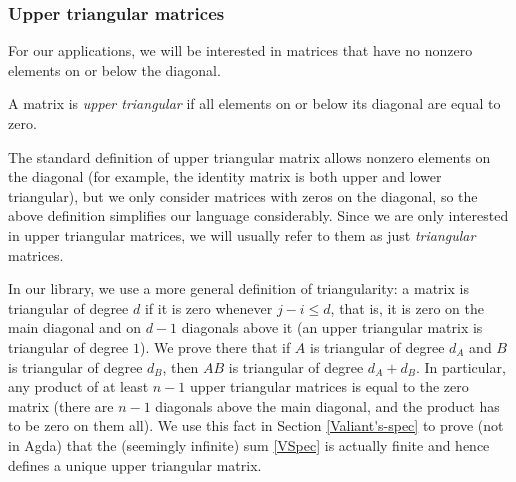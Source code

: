 \subsubsection{Upper triangular matrices}
\label{Triangular-matrices}
For our applications, we will be interested in matrices that have no nonzero elements on or below the diagonal.
\begin{Definition}
  A matrix is \emph{upper triangular} if all elements on or below its diagonal are equal to zero.
\end{Definition}
The standard definition of upper triangular matrix allows nonzero elements on the diagonal (for example, the identity matrix is both upper and lower triangular), but we only consider matrices with zeros on the diagonal, so the above definition simplifies our language considerably.
Since we are only interested in upper triangular matrices, we will usually refer to them as just \emph{triangular} matrices.

In our library, we use a more general definition of triangularity: a matrix is triangular of degree $d$ if it is zero whenever $j - i \le d$, that is, it is zero on the main diagonal and on $d - 1$ diagonals above it (an upper triangular matrix is triangular of degree $1$). We prove there that if $A$ is triangular of degree $d_A$ and $B$ is triangular of degree $d_B$, then $AB$ is triangular of degree $d_A + d_B$. In particular, any product of at least $n-1$ upper triangular matrices is equal to the zero matrix (there are $n-1$ diagonals above the main diagonal, and the product has to be zero on them all). We use this fact in Section \ref{Valiant's-spec} to prove (not in Agda) that the (seemingly infinite) sum \eqref{VSpec} is actually finite and hence defines a unique upper triangular matrix.
